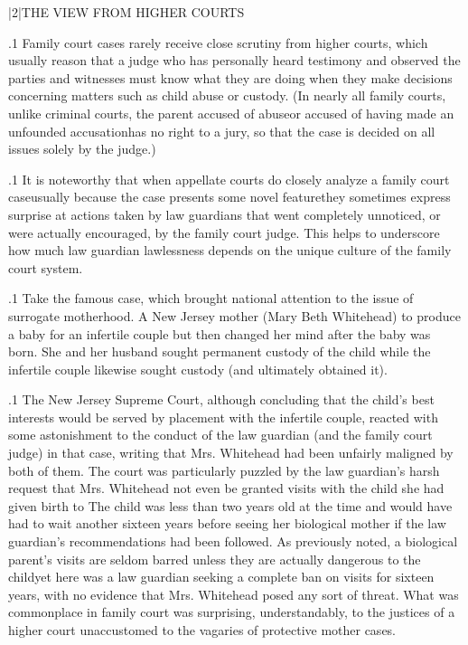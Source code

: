 \documentclass[11pt, twoside]{article}
\begin{document}
{{}%


\s|2|{THE VIEW FROM HIGHER COURTS}

\p.1{%
\noindent{}Family court cases rarely receive close scrutiny from higher courts,
which usually reason that a judge who has personally heard testimony
and observed the parties and witnesses must know what they are doing when they make decisions concerning matters such as child abuse
or custody. (In nearly all family courts, unlike criminal courts, the
parent accused of abuse\mdash{}or accused of having made an unfounded
accusation\mdash{}has no right to a jury, so that the case is decided on all issues
solely by the judge.)
}%

\p.1{%
It is noteworthy that when appellate courts do closely analyze a family
court case\mdash{}usually because the case presents some novel feature\mdash{}they
sometimes express surprise at actions taken by law guardians that went
completely unnoticed, or were actually encouraged, by the family court
judge. This helps to underscore how much law guardian lawlessness
depends on the unique culture of the family court system.
}%

\p.1{%
Take the famous  case, which brought national attention to the issue of surrogate motherhood. A New Jersey mother
(Mary Beth Whitehead)  to produce a baby for
an infertile couple but then changed her mind after the baby was
born. She and her husband sought permanent custody of the child
while the infertile couple likewise sought custody (and ultimately
obtained it).
}%

\p.1{%
The New Jersey Supreme Court, although concluding that the child’s
best interests would be served by placement with the infertile couple, reacted with some astonishment to the conduct of the law guardian (and
the family court judge) in that case, writing that Mrs. Whitehead had
been unfairly maligned by both of them. The court was particularly puzzled by the law guardian’s harsh request that Mrs. Whitehead not even
be granted visits with the child she had given birth to  The child was less than two years old at
the time and would have had to wait another sixteen years before seeing her biological mother if the law guardian’s recommendations had
been followed. As previously noted, a biological parent’s visits are seldom
barred unless they are actually dangerous to the child\mdash{}yet here was a
law guardian seeking a complete ban on visits for sixteen years, with no
evidence that Mrs. Whitehead posed any sort of threat. What was commonplace in family court was surprising, understandably, to the justices
of a higher court unaccustomed to the vagaries of protective mother
cases.
}%

}
\end{document}

